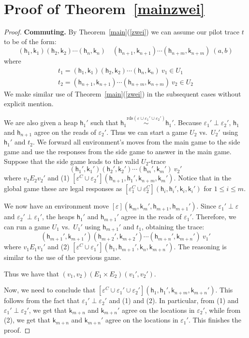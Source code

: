 \documentclass[nocopyrightspace,preprint]{sigplanconf}
\newcommand{\eff}{\varepsilon}
\newcommand{\reads}{\mathrm{rds}}
\newcommand{\rds}{\reads}
\newcommand\heap{\ensuremath{\mathsf{h}}\xspace}
\newcommand\h{\heap}
\renewcommand\k{\ensuremath{\mathsf{k}}\xspace}
\newcommand\rloc[3]{\ensuremath{#1 \stackrel{#3}{\sim} #2}}
\begin{document}
\section{Proof of Theorem~\ref{mainzwei}}

\begin{proof}
\textbf{Commuting.}
By Theorem~\ref{main}(\ref{zwei}) we can assume our pilot trace $t$ to be 
of the form:
\[
  (\h_1,\k_1) (\h_2,\k_2) \cdots (\h_n,\k_n)\quad (\h_{n+1},\k_{n+1}) \cdots (\h_{n+m},\k_{n+m})\ (a,b)
\]
where
\[
\begin{array}{l}
  t_1  = (\h_1,\k_1) (\h_2,\k_2) \cdots (\h_n,\k_n)\ v_1 \in U_1\\
  t_2 = (\h_{n+1},\k_{n+1}) \cdots (\h_{n+m},\k_{n+m})\ v_2 \in U_2
\end{array}  
\]
We make similar use of Theorem~\ref{main}(\ref{zwei}) in the subsequent cases without explicit mention. 

We are also given a heap $\h_1'$ such that $\rloc{\h_1}{\h_1'}{\rds(\eff \cup \eff_1' \cup \eff_2')}$. Because $\eff_1' \perp \eff_2'$, $\h_1$ and $\h_{n+1}$ agree on the reads of $\eff_2'$. Thus we can start a game $U_2$ vs.\ $U_2'$ using $\h_1'$ and $t_2$. We forward all environment's moves from the main game to the side game and use the responses from the side game to answer in the main game. Suppose that the side game leads to the valid $U_2$-trace 
\[
  (\h_1',\k_1') (\h_2',\k_2') \cdots (\h_m',\k_m') \ v_2'
\]
where $v_2 E_2 v_2'$ and (1) $[\eff^C \cup \eff_2'](\h_{n+1},\h_1',\k_{n+m},\k_m')$. 
Notice that in the global game these are legal responses as $[\eff_1^C \cup \eff_2^C](\h_i,\h_i',\k_{i},\k_{i}')$ for $1 \leq i \leq m$.

We now have an environment move $[\eff](\k_m,\k_{m}',\h_{m+1},\h_{m+1}')$. Since $\eff_1' \perp \eff$ and $\eff_2' \perp \eff_1'$, the heaps $\h_{1}'$ and $\h_{m+1}'$ agree in the reads of $\eff_1'$. Therefore, we can run a game $U_1$ vs.\ $U_1'$  using $\h_{m+1}'$ and $t_1$, obtaining the trace: 
\[
  (\h_{m+1}',\k_{m+1}') (\h_{m+2}',\k_{m+2}') \cdots (\h_{m+n}',\k_{m+n}') \ v_1'
\]
where $v_1 E_1 v_1'$ and (2) $[\eff^C \cup \eff_1'](\h_{1},\h_{m+1}',\k_{n},\k_{m+n}')$. The reasoning is similar to the use of the previous game.

Thus we have that $(v_1,v_2) (E_1 \times E_2)  (v_1',v_2')$.

Now, we need to conclude that $[\eff^C \cup \eff_1' \cup \eff_2'](\h_{1},\h_1',\k_{n+m},\k_{m+n}')$. This follows from the fact that $\eff_1' \perp \eff_2'$ and (1) and (2). In particular, from (1) and $\eff_1' \perp \eff_2'$, we get that $\k_{m+n}$ and $\k_{m+n}'$ agree on the locations in $\eff_2'$, while from (2), we get that $\k_{m+n}$ and $\k_{m+n}'$ agree on the locations in $\eff_1'$. This finishes the proof.


\end{proof}
\end{document}
